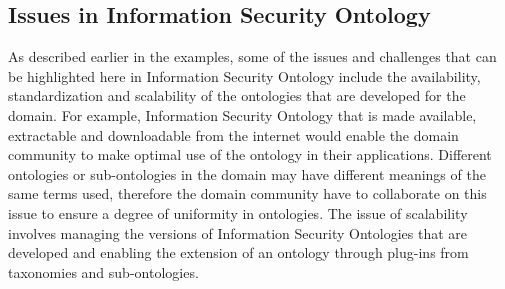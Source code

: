 \documentclass[conference, compsoc]{IEEEtran}
\begin{document}
\subsection{Issues in Information Security Ontology}
As described earlier in the examples, some of the issues and challenges that can be highlighted here in Information Security Ontology include the availability, standardization and scalability of the ontologies that are developed for the domain. For example, Information Security Ontology that is made available, extractable and downloadable from the internet would enable the domain community to make optimal use of the ontology in their applications. Different ontologies or sub-ontologies in the domain may have different meanings of the same terms used, therefore the domain community have to collaborate on this issue to ensure a degree of uniformity in ontologies. The issue of scalability involves managing the versions of Information Security Ontologies that are developed and enabling the extension of an ontology through plug-ins from taxonomies and sub-ontologies.

%
%



%
%
\end{document}
